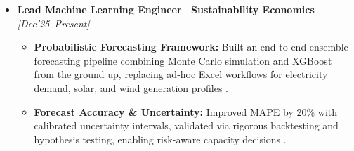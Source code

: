 \documentclass[10pt,article]{article}
\begin{document}
\begin{itemize}
   \item \textbf{Lead Machine Learning Engineer \textbar\ Sustainability Economics} \hfill \textit{[Dec'25--Present]}
   \begin{itemize}
       \item \textbf{Probabilistic Forecasting Framework:} Built an end-to-end ensemble forecasting pipeline combining Monte Carlo simulation and XGBoost from the ground up, replacing ad-hoc Excel workflows for electricity demand, solar, and wind generation profiles .
\item \textbf{Forecast Accuracy \& Uncertainty:} Improved MAPE by 20\% with calibrated uncertainty intervals, validated via rigorous backtesting and hypothesis testing, enabling risk-aware capacity decisions .

\end{itemize}
\end{itemize}
\end{document}
